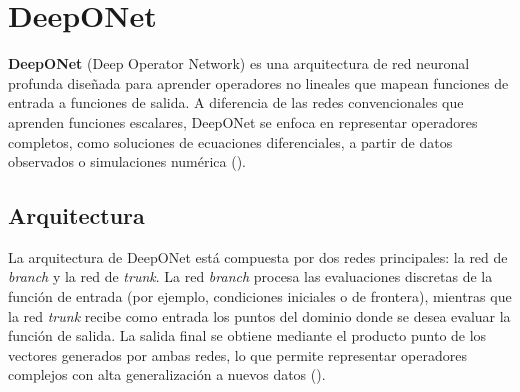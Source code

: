 \documentclass[
  spanish,
  us-letterpaper,
  DIV=11,
  numbers=noendperiod]{scrreprt}
\theoremstyle{plain}
\theoremstyle{definition}
\theoremstyle{remark}
\begin{document}
\chapter{DeepONet}\label{deeponet}

\textbf{DeepONet} (Deep Operator Network) es una arquitectura de red
neuronal profunda diseñada para aprender operadores no lineales que
mapean funciones de entrada a funciones de salida. A diferencia de las
redes convencionales que aprenden funciones escalares, DeepONet se
enfoca en representar operadores completos, como soluciones de
ecuaciones diferenciales, a partir de datos observados o simulaciones
numérica ().

\section{Arquitectura}\label{arquitectura}

La arquitectura de DeepONet está compuesta por dos redes principales: la
red de \emph{branch} y la red de \emph{trunk}. La red \emph{branch}
procesa las evaluaciones discretas de la función de entrada (por
ejemplo, condiciones iniciales o de frontera), mientras que la red
\emph{trunk} recibe como entrada los puntos del dominio donde se desea
evaluar la función de salida. La salida final se obtiene mediante el
producto punto de los vectores generados por ambas redes, lo que permite
representar operadores complejos con alta generalización a nuevos datos
().
\end{document}
